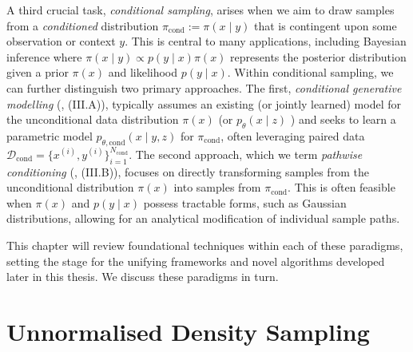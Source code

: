\label{ntn:conditional_dataset}\label{ntn:conditional_prob_distbn}
A third crucial task, \emph{conditional sampling}, arises when we aim to draw samples from a \emph{conditioned} distribution $\pi_{\text{cond}} := \pi(x \mid y)$ that is contingent upon some observation or context $y$. This is central to many applications, including Bayesian inference where $\pi(x \mid y) \propto p(y \mid x) \pi(x)$ represents the posterior distribution given a prior $\pi(x)$ and likelihood $p(y \mid x)$. Within conditional sampling, we can further distinguish two primary approaches. The first, \emph{conditional generative modelling}
(, (III.A)), typically assumes an existing (or jointly learned) model for the unconditional data distribution $\pi(x)$ (or $p_\theta(x \mid z)$ ) and seeks to learn a parametric model $p_{\theta, \text{cond}}(x \mid y, z)$ for $\pi_{\text{cond}}$, often leveraging paired data $\mathcal{D}_{\text{cond}} = \{x^{(i)}, y^{(i)}\}_{i=1}^{N_{\text{cond}}}$. The second approach, which we term \emph{pathwise conditioning} (, (III.B)), focuses on directly transforming samples from the unconditional distribution $\pi(x)$ into samples from $\pi_{\text{cond}}$. This is often feasible when $\pi(x)$ and $p(y \mid x)$ possess tractable forms, such as Gaussian distributions, allowing for an analytical modification of individual sample paths. 

This chapter will review foundational techniques within each of these paradigms, setting the stage for the unifying frameworks and novel algorithms developed later in this thesis. We discuss these paradigms in turn.

\section{Unnormalised Density Sampling}
\label{sec:unnormalised_density_sampling}

